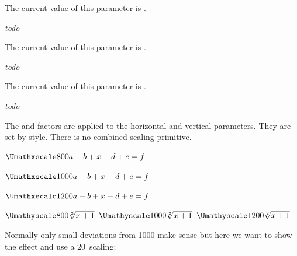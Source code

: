 \startnewprimitive[title={\prm {Umathunderdelimitervariant}}]

The current value of this parameter is \CurrentMathVariant \Umathunderdelimitervariant.

\stopnewprimitive

\startnewprimitive[title={\prm {Umathunderdelimitervgap}}]

{\em todo} 

\stopnewprimitive

\startnewprimitive[title={\prm {Umathunderlinevariant}}]

The current value of this parameter is \CurrentMathVariant \Umathunderlinevariant.

\stopnewprimitive

\startnewprimitive[title={\prm {Umathuseaxis}}]

{\em todo} 

\stopnewprimitive

\startnewprimitive[title={\prm {Umathvextensiblevariant}}]

The current value of this parameter is \CurrentMathVariant \Umathvextensiblevariant.

\stopnewprimitive

\startnewprimitive[title={\prm {Umathvoid}}]

{\em todo} 

\stopnewprimitive

\startnewprimitive[title={\prm {Umathxscale}}]

The  and  factors are applied to the
horizontal and vertical parameters. They are set by style. There is no combined
scaling primitive.

\startbuffer
$\Umathxscale\textstyle  800 a + b + x + d + e = f $\par
$\Umathxscale\textstyle 1000 a + b + x + d + e = f $\par
$\Umathxscale\textstyle 1200 a + b + x + d + e = f $\blank

$\Umathyscale\textstyle  800 \sqrt[2]{x+1}$\quad
$\Umathyscale\textstyle 1000 \sqrt[2]{x+1}$\quad
$\Umathyscale\textstyle 1200 \sqrt[2]{x+1}$\blank
\stopbuffer

\typebuffer

Normally only small deviations from 1000 make sense but here we want to show the
effect and use a 20\percent\ scaling:

